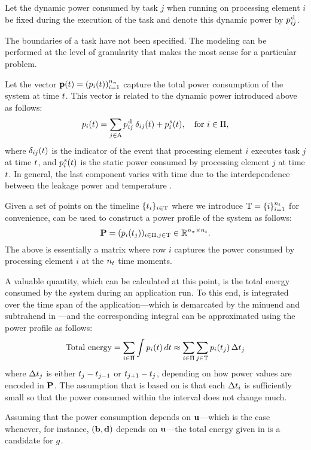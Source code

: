 Let the dynamic power consumed by task $j$ when running on processing element
$i$ be fixed during the execution of the task and denote this dynamic power by
$p^{\text{\kern0.1emd}}_{ij}$.

\begin{remark}
The boundaries of a task have not been specified. The modeling can be performed
at the level of granularity that makes the most sense for a particular problem.
\end{remark}

Let the vector $\mathbf{p}(t) = (p_i(t))_{i = 1}^{{n_\pi}}$ capture the total power
consumption of the system at time $t$. This vector is related to the dynamic
power introduced above as follows:
\begin{equation} \elab{power}
  \p_i(\t) = \sum_{j \in \tasks} \p^\dynamic_{ij} \: \delta_{ij} (\t) + \p^\static_i(\t), \hspace{1em} \text{for $i \in \procs$},
\end{equation}
where $\delta_{ij}(t)$ is the indicator of the event that processing element
$i$ executes task $j$ at time $t$, and $p^{\text{\kern0.1ems}}_i(t)$ is the static power
consumed by processing element $j$ at time $t$. In general, the last component
varies with time due to the interdependence between the leakage power and
temperature \cite{liu2007}.

Given a set of points on the timeline $\{ t_i \}_{i \in \mathrm{T}}$ where we
introduce $\mathrm{T} = \{ i \}_{i = 1}^{n_t}$ for convenience,  can be used
to construct a power profile of the system as follows:
\[
  \mathbf{P} = (p_i(t_j))_{i \in \Pi, j \in \mathrm{T}} \in \mathbb{R}^{{n_\pi} \times {n_t}}.
\]
The above is essentially a matrix where row $i$ captures the power consumed by
processing element $i$ at the ${n_t}$ time moments.

A valuable quantity, which can be calculated at this point, is the total energy
consumed by the system during an application run. To this end,  is
integrated over the time span of the application---which is demarcated by the
minuend and subtrahend in ---and the corresponding
integral can be approximated using the power profile as follows:
\begin{equation} \elab{total-energy}
  \text{Total energy} = \sum_{i \in \procs} \int \p_i(\t) \, d\t \approx \sum_{i \in \procs} \sum_{j \in \ts} \p_i(\t_j) \, \Delta \t_j
\end{equation}
where $\Delta t_j$ is either $t_j - t_{j - 1}$ or $t_{j + 1} - t_j$,
depending on how power values are encoded in $\mathbf{P}$. The assumption that
 is based on is that each $\Delta t_i$ is sufficiently small
so that the power consumed within the interval does not change much.

Assuming that the power consumption depends on $\mathbf{u}$---which is the case
whenever, for instance, $(\mathbf{b}, \mathbf{d})$ depends on $\mathbf{u}$---the total energy given
in  is a candidate for $g$.
